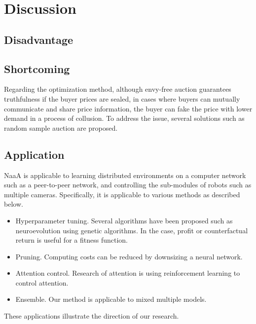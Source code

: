 \section{Discussion}
\subsection{Disadvantage}
\subsection{Shortcoming}

Regarding the optimization method,
although envy-free auction guarantees truthfulness if the buyer prices are sealed,
in cases where buyers can mutually communicate and share price information, 
the buyer can fake the price with lower demand in a process of collusion.
To address the issue, several solutions such as random sample auction \cite{goldberg2006competitive} are proposed.



\subsection{Application}
NaaA is applicable to learning distributed environments on a computer network such as a peer-to-peer network, and controlling the sub-modules of robots such as multiple cameras.
Specifically, it is applicable to various methods as described below.
\begin{itemize}
\item Hyperparameter tuning. 
Several algorithms have been proposed such as neuroevolution using genetic algorithms.
In the case, profit or counterfactual return is useful for a fitness function.
\item Pruning. Computing costs can be reduced by downsizing a neural network.
\item Attention control. Research of attention is using reinforcement learning to control attention.
\item Ensemble. Our method is applicable to mixed multiple models.

\end{itemize}
These applications illustrate the direction of our research.
